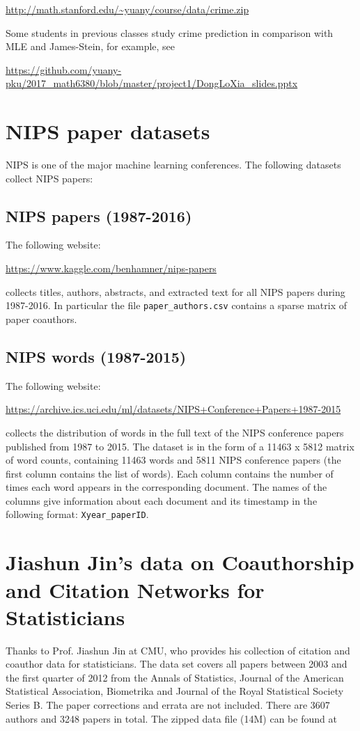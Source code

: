 \documentclass[11pt]{article}
\begin{document}
\url{http://math.stanford.edu/~yuany/course/data/crime.zip}

\noindent Some students in previous classes study crime prediction in comparison with MLE and James-Stein, for example, see

\url{https://github.com/yuany-pku/2017_math6380/blob/master/project1/DongLoXia_slides.pptx}


\section{NIPS paper datasets}
NIPS is one of the major machine learning conferences. The following datasets collect NIPS papers:

\subsection{NIPS papers (1987-2016)} The following website: 

\url{https://www.kaggle.com/benhamner/nips-papers}

\noindent collects titles, authors, abstracts, and extracted text for all NIPS papers during 1987-2016. In particular the file {\texttt{paper\_authors.csv}} contains a sparse matrix of paper coauthors. 

\subsection{NIPS words (1987-2015)} The following website:

\url{https://archive.ics.uci.edu/ml/datasets/NIPS+Conference+Papers+1987-2015}

\noindent collects the distribution of words in the full text of the NIPS conference papers published from 1987 to 2015. The dataset is in the form of a 11463 x 5812 matrix of word counts, containing 11463 words and 5811 NIPS conference papers (the first column contains the list of words). Each column contains the number of times each word appears in the corresponding document. The names of the columns give information about each document and its timestamp in the following format: {\texttt{Xyear\_paperID}}. 


\section{Jiashun Jin's data on Coauthorship and Citation Networks for Statisticians}
Thanks to Prof. Jiashun Jin at CMU, who provides his collection of citation and coauthor data for statisticians. The data set covers all papers between 2003 and the first quarter of 2012 from the Annals of Statistics, Journal of the American Statistical Association, Biometrika and Journal of the Royal Statistical Society Series B. The paper corrections and errata are not included. There are 3607 authors and 3248 papers in total. The zipped data file (14M) can be found at 
\end{document}
